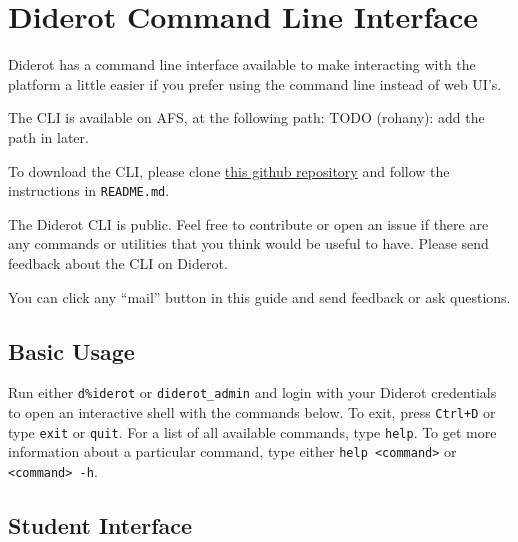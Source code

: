 \chapter{Diderot Command Line Interface}

Diderot has a command line interface available to make interacting
with the platform a little easier if you prefer using the command
line instead of web UI's.

\begin{important}

The CLI is available on AFS, at the following path: TODO (rohany): add the path in later.

To download the CLI, please clone 
%
\href{https://github.com/diderot-edu/diderot-cli}{this github repository}
%
and follow the instructions in \lstinline`README.md`. 

The Diderot CLI is public. Feel free to contribute or open an issue if there
are any commands or utilities that you think would be useful to have. Please
send feedback about the CLI on Diderot.
\end{important}

\begin{note}
You can click any ``mail''  button in this guide and send feedback or ask questions. 
\end{note}

\section{Basic Usage}

Run either \verb|d%iderot| or \verb|diderot_admin| and login with your Diderot credentials
to open an interactive shell with the commands below.
To exit, press \verb|Ctrl+D| or type \verb|exit| or \verb|quit|.
For a list of all available commands, type \verb|help|. To get more information
about a particular command, type either \verb|help <command>| or \verb|<command> -h|.

\section{Student Interface}

